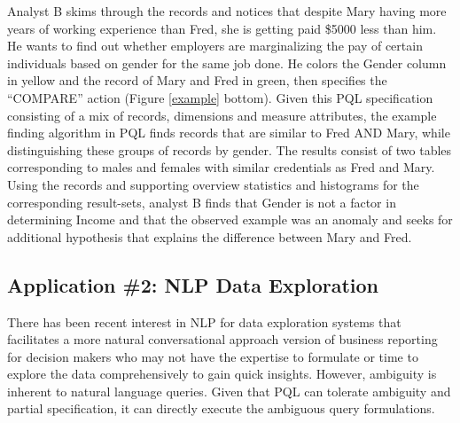 \documentclass{sig-alternate-05-2015}
\begin{document}
\par Analyst B skims through the records and notices that despite Mary having more years of working experience than Fred, she is getting paid \$5000 less than him. He wants to find out whether employers are marginalizing the pay of certain individuals based on gender for the same job done. He colors the Gender column in yellow and the record of Mary and Fred in green, then specifies the ``COMPARE'' action (Figure \ref{example} bottom). Given this PQL specification consisting of a mix of records, dimensions and measure attributes, the example finding algorithm in PQL finds records that are similar to Fred AND Mary, while distinguishing these groups of records by gender. The results consist of two tables corresponding to males and females with similar credentials as Fred and Mary. Using the records and supporting overview statistics and histograms for the corresponding result-sets, analyst B finds that Gender is not a factor in determining Income and that the observed example was an anomaly and seeks for additional hypothesis that explains the difference between Mary and Fred.
\subsection{Application \#2: NLP Data Exploration}
There has been recent interest in NLP for data exploration systems that facilitates a more natural conversational approach version of business reporting for decision makers who may not have the expertise to formulate or time to explore the data comprehensively to gain quick insights\cite{tableauBIreport2018}. However, ambiguity is inherent to natural language queries\cite{Gao2015,Hoque2017}. Given that PQL can tolerate ambiguity and partial specification, it can directly execute the ambiguous query formulations.
\end{document}
